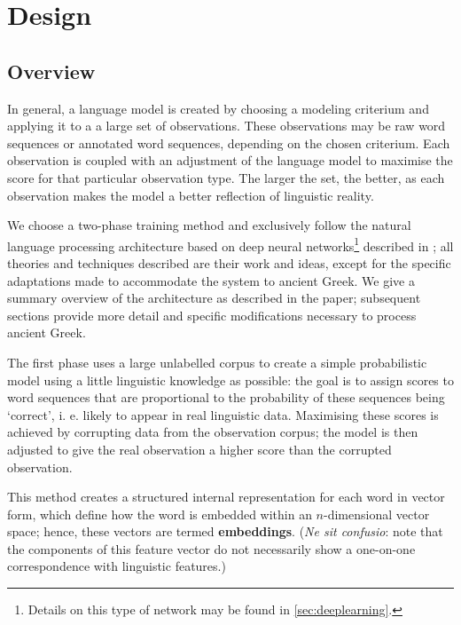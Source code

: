 \chapter{Design}
\label{chp:design} %

\section{Overview}
In general, a language model is created by choosing a modeling
criterium and applying it to a a large set of observations. These
observations may be raw word sequences or annotated word sequences,
depending on the chosen criterium. Each observation is coupled with an
adjustment of the language model to maximise the score for that
particular observation type. The larger the set, the better, as each
observation makes the model a better reflection of linguistic reality.

We choose a two-phase training method and exclusively follow the
natural language processing architecture based on deep neural
networks\footnote{Details on this type of network may be found in
\vref{sec:deeplearning}.} described in \cite{collobert-2011}; all
theories and techniques described are their work and ideas, except for
the specific adaptations made to accommodate the system to ancient
Greek. We give a summary overview of the architecture as described in
the paper; subsequent sections provide more detail and specific
modifications necessary to process ancient Greek.

The first phase uses a large unlabelled corpus to create a simple
probabilistic model using a little linguistic knowledge as possible:
the goal is to assign scores to word sequences that are proportional
to the probability of these sequences being `correct', i. e. likely to
appear in real linguistic data. Maximising these scores is achieved by
corrupting data from the observation corpus; the model is then
adjusted to give the real observation a higher score than the
corrupted observation.

This method creates a structured internal representation for each word
in vector form, which define how the word is embedded within an
$n$-dimensional vector space; hence, these vectors are termed
\textbf{embeddings}. (\textit{Ne sit confusio}: note that the
components of this feature vector do not necessarily show a one-on-one
correspondence with linguistic features.)

